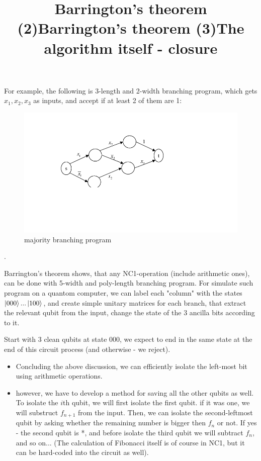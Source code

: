\documentclass{article}
\begin{document}
{\title{Barrington's theorem (2)}
For example, the following is 3-length and 2-width branching program, which gets $x_{1},x_{2},x_{3}$ as inputs, and accept if at least 2 of them are 1:
\begin{figure}
\includegraphics[scale=0.5]{majority} 
\caption{majority branching program}
\end{figure}.


\title{Barrington's theorem (3)}
Barrington's theorem shows, that any NC1-operation (include arithmetic ones), can be done with 5-width and poly-length branching program. For simulate such program on a quantom computer, we can label each "column" with the states $\left\vert{000}\right\rangle...\left\vert{100}\right\rangle$, and create simple unitary matrices for each branch, that extract the relevant qubit from the input, change the state of the 3 ancilla bits according to it. 

Start with 3 clean qubits at state 000, we expect to end in the same state at the end of this circuit process (and otherwise - we reject).


\title{The algorithm itself - closure}
\begin{itemize}
\item Concluding the above discussion, we can efficiently isolate the left-most bit using arithmetic operations.
\item however, we have to develop a method for saving all the other qubits as well. To isolate the $i$th qubit, we will first isolate the first qubit. if it was one, we will substruct $f_{n+1}$ from the input. Then, we can isolate the second-leftmost qubit by asking whether the remaining number is bigger then $f_{n}$ or not. If yes - the second qubit is *, and before isolate the third qubit we will subtract $f_{n}$, and so on... (The calculation of Fibonacci itself is of course in NC1, but it can be hard-coded into the circuit as well).
\end{itemize}






}
\end{document}
